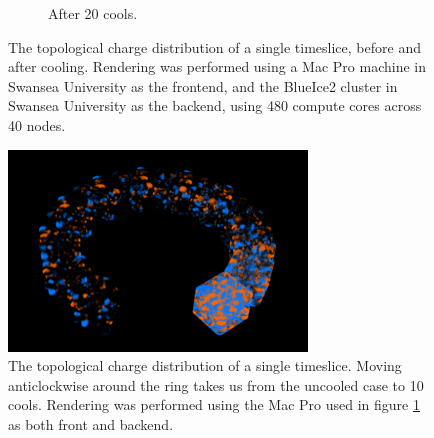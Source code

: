 \begin{figure}
\begin{subfigure}[b]{0.35\textwidth}
\caption{After 20 cools.}
\end{subfigure}

\caption{The topological charge distribution of a single timeslice, before and after cooling. Rendering was performed using a Mac Pro machine in Swansea University as the frontend, and the BlueIce2 cluster in Swansea University as the backend, using 480 compute cores across 40 nodes. }
\label{fig:timeslices}
\end{figure}

\begin{figure}
\centering
\includegraphics[width=\textwidth]{torus0010.png}

\caption{The topological charge distribution of a single timeslice. Moving anticlockwise around the ring takes us from the uncooled case to 10 cools. Rendering was performed using the Mac Pro used in figure \ref{fig:timeslices} as both front and backend. }
\label{fig:timeslice-ring}
\end{figure}

